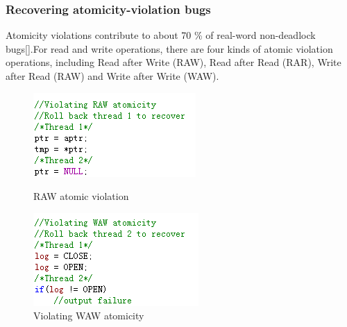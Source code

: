 \subsubsection{Recovering atomicity-violation bugs}
Atomicity violations contribute to about 70 \% of real-word non-deadlock bugs[].For read and write operations, there are four kinds of atomic violation operations, including Read after Write (RAW), Read after Read (RAR), Write after Read (RAW) and Write after Write (WAW). 
\begin{figure}
\begin{minipage}[t]{0.48\linewidth}
\centering
\includegraphics[width=\textwidth]{figs/RAW.png}
\caption{RAW atomic violation}
\label {RAW}
\end{minipage}%
\begin{minipage}[t]{0.48\linewidth}
\centering
\includegraphics[width=\textwidth]{figs/WAW.png}
\caption{Violating WAW atomicity}
\label{WAW}
\end{minipage}
\end{figure}

